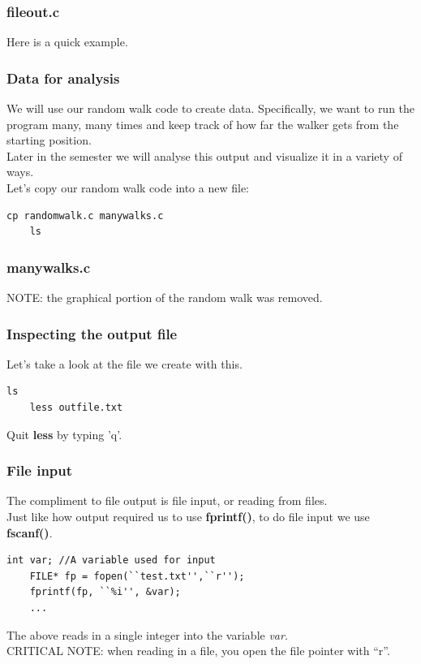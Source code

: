 \documentclass{beamer}
\begin{document}
\begin{frame}
  \frametitle{fileout.c}
  Here is a quick example.
  
  
\end{frame}

\begin{frame}[fragile]
  \frametitle{Data for analysis}
  We will use our random walk code to create data. Specifically, we want to run the program
  many, many times and keep track of how far the walker gets from the starting position.\\
  Later in the semester we will analyse this output and visualize it in a variety of ways.\\
  Let's copy our random walk code into a new file:
  \begin{lstlisting}[style=custombash]
    cp randomwalk.c manywalks.c
    ls
\end{lstlisting}
\end{frame}

\begin{frame}
  \frametitle{manywalks.c}
  NOTE: the graphical portion of the random walk was removed.
  
\end{frame}

\begin{frame}[fragile]
  \frametitle{Inspecting the output file}
  Let's take a look at the file we create with this.
  \begin{lstlisting}[style=custombash]
    ls
    less outfile.txt
  \end{lstlisting}
  Quit \textbf{less} by typing 'q'.
\end{frame}

\begin{frame}[fragile]
  \frametitle{File input}
  The compliment to file output is file input, or reading from files.\\
  Just like how output required us to use \textbf{fprintf()}, to do
  file input we use \textbf{fscanf()}.
  \begin{lstlisting}[style=customc]
    int var; //A variable used for input
    FILE* fp = fopen(``test.txt'',``r'');
    fprintf(fp, ``%i'', &var);
    ...
  \end{lstlisting}
  The above reads in a single integer into the variable \textit{var}.\\
  \vspace{12pt}
  CRITICAL NOTE: when reading in a file, you open the file pointer with ``r''.
\end{frame}
\end{document}
